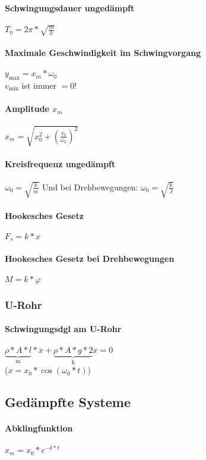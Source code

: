 \documentclass[12pt, a4paper]{scrreprt}
\begin{document}
\paragraph{Schwingungsdauer ungedämpft} \dotfill \(T_0=2\pi*\sqrt{\frac{m}{k}}\)
\paragraph{Maximale Geschwindigkeit im Schwingvorgang} \dotfill \(y_{\max} = x_m * \omega _0\)\\
\myhspace \textcolor{myred}{\(v_{\min}\) ist immer \(= 0\)!}
\paragraph{Amplitude \(x_m\)} \dotfill \(x_m = \sqrt{x_0^2 + {\left( \frac{v_0}{\omega _0} \right)}^2}\)
\paragraph{Kreisfrequenz ungedämpft} \dotfill \(\omega_0=\sqrt{\frac{k}{m}}\) Und bei Drehbewegungen: \(\omega_0=\sqrt{\frac{k}{J}}\)
\paragraph{Hookesches Gesetz} \dotfill \(F_s=k*x\)
\paragraph{Hookesches Gesetz bei Drehbewegungen} \dotfill \(M = k * \varphi\)

\subsubsection{U-Rohr}
\paragraph{Schwingungsdgl am U-Rohr} \dotfill \(\underbrace{\rho*A*l}_\text{m}*\ddot x+\underbrace{\rho*A*g*2}_\text{k}x=0\)\\
(\(x=x_0*\cos(\omega_0*t)\))


\subsection{Gedämpfte Systeme}

\paragraph{Abklingfunktion} \dotfill \(x_m=x_0*e^{-\delta*t}\)
\end{document}
